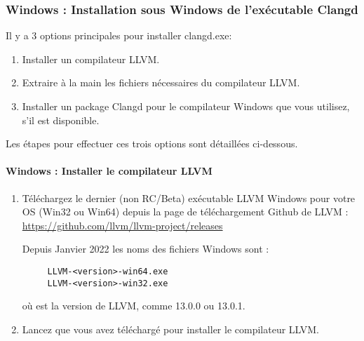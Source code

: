 \subsubsection{Windows : Installation sous Windows de l'exécutable Clangd}\label{sec:win_install}

Il y a 3 options principales pour installer clangd.exe:
\begin{enumerate}[noitemsep]
\item Installer un compilateur LLVM.
\item Extraire à la main les fichiers nécessaires du compilateur LLVM.
\item Installer un package Clangd pour le compilateur Windows que vous utilisez, s'il est disponible.
\end{enumerate}

Les étapes pour effectuer ces trois options sont détaillées ci-dessous.

\paragraph*{Windows : Installer le compilateur LLVM}\label{sec:llvm_install}

\begin{enumerate}[noitemsep]
\item Téléchargez le dernier (non RC/Beta) exécutable LLVM Windows pour votre OS (Win32 ou Win64) depuis la page de téléchargement Github de LLVM : \newline
      \url{https://github.com/llvm/llvm-project/releases} \newline

  Depuis Janvier 2022 les noms des fichiers Windows sont :
  \begin{verbatim}
     LLVM-<version>-win64.exe
     LLVM-<version>-win32.exe
  \end{verbatim}
  où  est la version de LLVM, comme 13.0.0 ou 13.0.1.\\

\item Lancez  que vous avez téléchargé pour installer le compilateur LLVM.
\end{enumerate}

